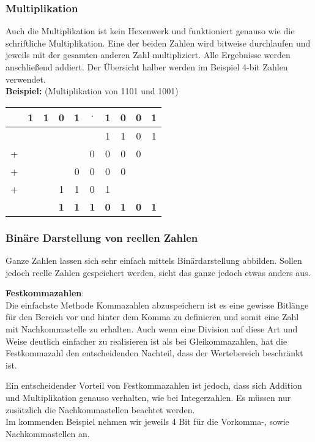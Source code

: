 \subsubsection{Multiplikation}
Auch die Multiplikation ist kein Hexenwerk und funktioniert genauso wie die schriftliche Multiplikation. Eine der beiden Zahlen wird bitweise durchlaufen und jeweils mit der gesamten anderen Zahl multipliziert. Alle Ergebnisse werden anschließend addiert.
\newpage
Der Übersicht halber werden im Beispiel 4-bit Zahlen verwendet.\\

\textbf{Beispiel:} (Multiplikation von 1101 und 1001)\\ 
\begin{tabular}{cccccccccc}
	&1&1&0&1&$\cdot$&1&0&0&1\\
	\hline
	 &&&&&&1&1&0&1\\
	+&&&&&0&0&0&0&\\
	+&&&&0&0&0&0&&\\
	+&&&1&1&0&1&&&\\
	\hline
	 &&&\textbf{1}&\textbf{1}&\textbf{1}&\textbf{0}&\textbf{1}&\textbf{0}&\textbf{1}
\end{tabular}

\subsubsection{Binäre Darstellung von reellen Zahlen}
Ganze Zahlen lassen sich sehr einfach mittels Binärdarstellung abbilden. Sollen jedoch reelle Zahlen gespeichert werden, sieht das ganze jedoch etwas anders aus.

\textbf{Festkommazahlen}:\\
Die einfachste Methode Kommazahlen abzuspeichern ist es eine gewisse Bitlänge für den Bereich vor und hinter dem Komma zu definieren und somit eine Zahl mit Nachkommastelle zu erhalten. Auch wenn eine Division auf diese Art und Weise deutlich einfacher zu realisieren ist als bei Gleikommazahlen, hat die Festkommazahl den entscheidenden Nachteil, dass der Wertebereich beschränkt ist.

Ein entscheidender Vorteil von Festkommazahlen ist jedoch, dass sich Addition und Multiplikation genauso verhalten, wie bei Integerzahlen. Es müssen nur zusätzlich die Nachkommastellen beachtet werden.\\
Im kommenden Beispiel nehmen wir jeweils 4 Bit für die Vorkomma-, sowie Nachkommastellen an.\\

